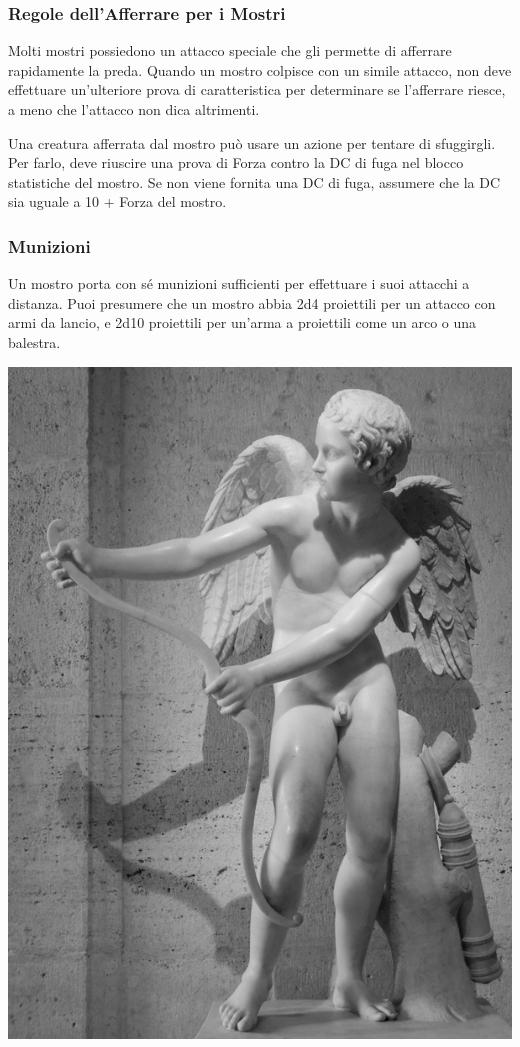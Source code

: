 \begin{multicols}{2}
\subsubsection{Regole dell'Afferrare per i Mostri}

Molti mostri possiedono un attacco speciale che gli permette di afferrare rapidamente la preda. Quando un mostro colpisce con un simile attacco, non deve effettuare un'ulteriore prova di caratteristica per determinare se l'afferrare riesce, a meno che l'attacco non dica altrimenti.

Una creatura afferrata dal mostro può usare un azione per tentare di sfuggirgli. Per farlo, deve riuscire una prova di Forza contro la DC di fuga nel blocco statistiche del mostro. Se non viene fornita una DC di fuga, assumere che la DC sia uguale a 10 + Forza del mostro.

\subsubsection{Munizioni}

Un mostro porta con sé munizioni sufficienti per effettuare i suoi attacchi a distanza. Puoi presumere che un mostro abbia 2d4 proiettili per un attacco con armi da lancio, e 2d10 proiettili per un'arma a proiettili come un arco o una balestra.


\includegraphics[width=0.7\linewidth]{immagini/cupido.png}


\end{multicols}
